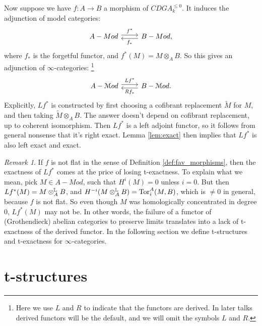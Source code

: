 \documentclass[10pt,a4paper,reqno,oneside]{book} %
\theoremstyle{plain}
\theoremstyle{definition}
\theoremstyle{remark}
\newtheorem{rem}[thm]{Remark}
\numberwithin{equation}{section}
\begin{document}
Now suppose we have $f: A \to B$ a morphism of $CDGA_k^{\leq 0}$. It induces the adjunction of model categories:
\[
\begin{tikzcd}
A-Mod\arrow[shift left]{r}{f^*} & B-Mod\arrow[shift left]{l}{f_*},
\end{tikzcd}
\]
where $f_*$ is the forgetful functor, and $f^*(M) = M \otimes_A B$. So this gives an adjunction of $\infty$-categories:
\footnote{Here we use $L$ and $R$ to indicate that the functors are derived.
In later talks derived functors will be the default, and we will omit the symbols $L$ and $R$.}
\[
\begin{tikzcd}
\label{tikz:adjunction}
A-\cM od\arrow[shift left]{r}{Lf^*} & B-\cM od\arrow[shift left]{l}{Rf_*}.
\end{tikzcd}
\]
Explicitly, $Lf^*$ is constructed by first choosing a cofibrant replacement $\tilde M$ for $M$, 
and then taking $\tilde M \otimes_A B$. The
answer doesn't depend on cofibrant replacement, up to coherent isomorphism. Then $Lf^*$ is a left adjoint
functor, so it follows from general nonsense that it's right exact. Lemma \ref{lem:exact} then implies that $Lf^*$
is also left exact and exact.

\begin{rem}
\label{rem:exact_t}
If $f$ is not flat in the sense of Definition \ref{def:fav_morphisms}, then the exactness of
$Lf^*$ comes at the price of losing t-exactness. To explain what we mean, pick $M \in A-Mod$, such that
$H^i(M) = 0$ unless $i = 0$. But then $Lf^*(M) = M \otimes_A^{\mathbb L} B$, and $H^{-i}(M\otimes_A^{\mathbb L}B) = \mathrm{Tor}_i^A(M,B)$, which
is $\neq 0$ in general, because $f$ is not flat. So even though $M$ was homologically concentrated in degree 0, $Lf^*(M)$ may
not be. In other words, the failure of a functor of (Grothendieck) abelian categories to preserve limits translates into a lack 
of t-exactness of the derived functor. In the following section we define t-structures and t-exactness for $\infty$-categories.
\end{rem}


\section{t-structures}
\label{sect:t-struct}
\end{document}
